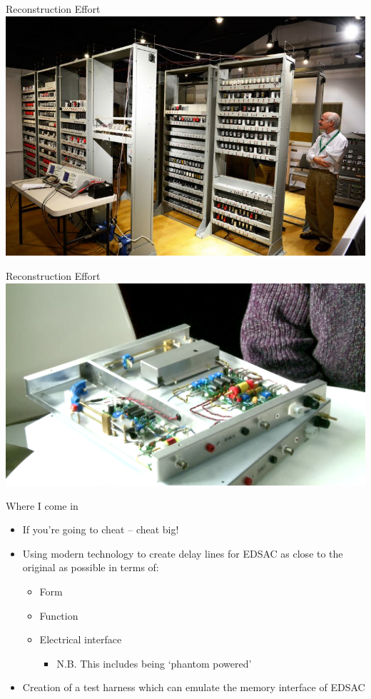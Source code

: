 \documentclass[aspectratio=169,11pt, xcolor={table}]{beamer}
\begin{document}
\begin{frame}{Reconstruction Effort}
	\centering
	\includegraphics[height=0.8\textheight]{figs/edsac_reconstructed}
\end{frame}

\begin{frame}{Reconstruction Effort}
	\centering
	\includegraphics[height=0.8\textheight]{figs/nickel-delay}
\end{frame}

\begin{frame}{Where I come in}

\begin{itemize}
	\item \alert{If you're going to cheat -- cheat big!}
	
	\item Using modern technology to create delay lines for EDSAC as close to the original as possible in terms of:
	\begin{itemize}
		\item Form
		\item Function
		\item Electrical interface
		\begin{itemize}
			\item N.B. This includes being `phantom powered'
		\end{itemize}
	\end{itemize}
	\item Creation of a test harness which can emulate the memory interface of EDSAC
\end{itemize}
\end{frame}
\end{document}
